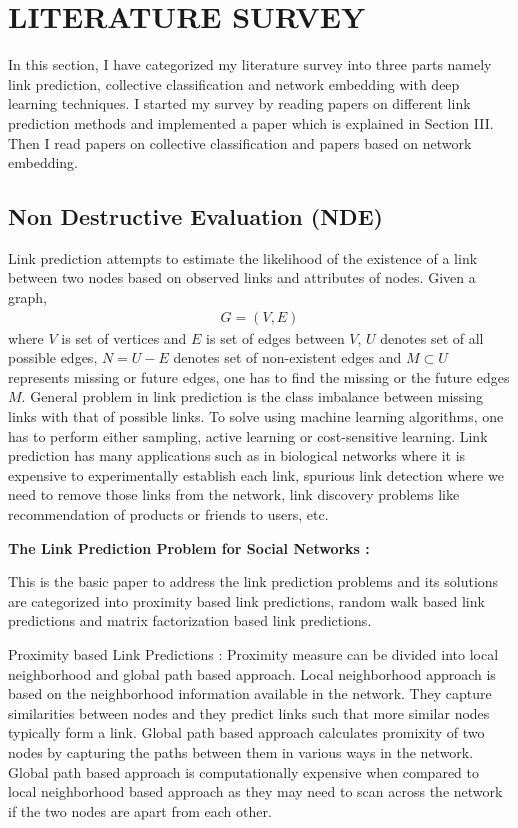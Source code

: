 \chapter{LITERATURE SURVEY}
\label{chap:intro}
In this section, I have categorized my literature survey into three parts namely link prediction, collective classification and network embedding with deep learning techniques. I started my survey by reading papers on different link prediction methods and implemented a paper which is explained in Section III. Then I read papers on collective classification and papers based on network embedding.

\section{\textbf{Non Destructive Evaluation (NDE)}}

Link prediction attempts to estimate the likelihood of the existence of a link between two nodes based on observed links and attributes of nodes. Given a graph,
\begin{align*}
G = (V , E)
\end{align*}
where $V$ is set of vertices and $E$ is set of edges between $V$, $U$ denotes set of all possible edges, $N = U - E$ denotes set of non-existent edges and $M \subset U$ represents missing or future edges, one has to find the missing or the future edges $M$. General problem in link prediction is the class imbalance between missing links with that of possible links. To solve using machine learning algorithms, one has to perform either sampling, active learning or cost-sensitive learning. Link prediction has many applications such as in biological networks where it is expensive to experimentally establish each link, spurious link detection where we need to remove those links from the network, link discovery problems like recommendation of products or friends to users, etc.

\begin{flushleft}
\textbf{The Link Prediction Problem for Social Networks \cite{linkpred} :}
\end{flushleft}

\indent This is the basic paper to address the link prediction problems and its solutions are categorized into proximity based link predictions, random walk based link predictions and matrix factorization based link predictions.

Proximity based Link Predictions : Proximity measure can be divided into local neighborhood and global path based approach. Local neighborhood approach is based on the neighborhood information available in the network. They capture similarities between nodes and they predict links such that more similar nodes typically form a link. Global path based approach calculates promixity of two nodes by capturing the paths between them in various ways in the network. Global path based approach is computationally expensive when compared to local neighborhood based approach as they may need to scan across the network if the two nodes are apart from each other.

